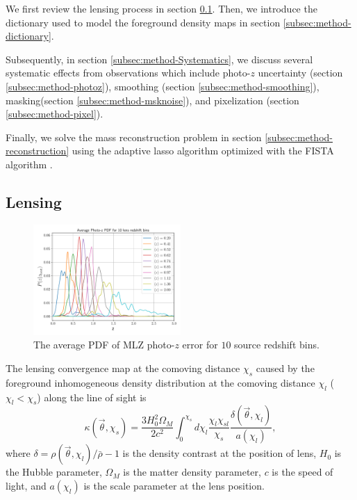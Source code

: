 \documentclass[twocolumn]{aastex62}
\begin{document}
We first review the lensing process in section \ref{subsec:method-delta2shear}.
Then, we introduce the dictionary used to model the foreground density maps in
section \ref{subsec:method-dictionary}.

Subsequently, in section \ref{subsec:method-Systematics}, we discuss several
systematic effects from observations which include photo-$z$ uncertainty
(section \ref{subsec:method-photoz}), smoothing (section
\ref{subsec:method-smoothing}), masking(section \ref{subsec:method-msknoise}),
and pixelization (section \ref{subsec:method-pixel}).

Finally, we solve the mass reconstruction problem in section
\ref{subsec:method-reconstruction} using the adaptive lasso algorithm
\citep{AdaLASSO-Zou2006} optimized with the FISTA algorithm
\citep{FISTA-Beck2009}.


\subsection{Lensing}
\label{subsec:method-delta2shear}

\begin{figure}[!t]
 \centering
 \includegraphics[width=0.5\textwidth]{mlz-poz.pdf}
 \caption{The average PDF of MLZ photo-$z$ error for $10$ source redshift bins.
        }\label{fig-pdfpz}
\end{figure}

The lensing convergence map at the comoving distance $\chi_s$ caused by the
foreground inhomogeneous density distribution at the comoving distance $\chi_l$
($\chi_l< \chi_s$) along the line of sight is
\begin{equation}
\kappa(\vec{\theta},\chi_s)=\frac{3H_0^2\Omega_M}{2 c^2} \int_0^{\chi_s} d\chi_l \frac{\chi_l \chi_{sl}}{\chi_s}
\frac{\delta(\vec{\theta},\chi_l)}{a(\chi_l)},
\end{equation}
where $\delta=\rho(\vec{\theta},\chi_l)/\bar{\rho}-1$ is the density contrast
at the position of lens, $H_0$ is the Hubble parameter, $\Omega_M$ is the
matter density parameter, $c$ is the speed of light, and $a(\chi_l)$ is the
scale parameter at the lens position.
\end{document}
